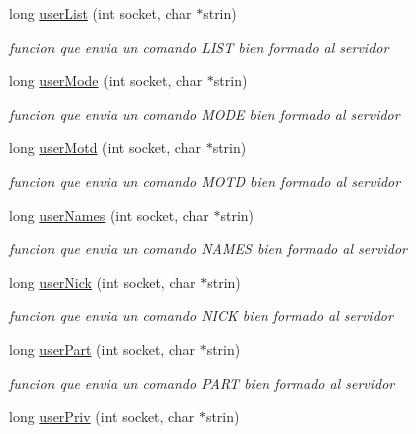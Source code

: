 \begin{DoxyCompactItemize}
long \hyperlink{_g-2301-05-_p2-user_commands_8h_a5f1403750b505dd46e42b4ee15f746da}{user\-List} (int socket, char $\ast$strin)
\begin{DoxyCompactList}\small\item\em funcion que envia un comando L\-I\-S\-T bien formado al servidor \end{DoxyCompactList}\item 
long \hyperlink{_g-2301-05-_p2-user_commands_8h_a97047be2e2e4c4de7a0b50bf5dbab322}{user\-Mode} (int socket, char $\ast$strin)
\begin{DoxyCompactList}\small\item\em funcion que envia un comando M\-O\-D\-E bien formado al servidor \end{DoxyCompactList}\item 
long \hyperlink{_g-2301-05-_p2-user_commands_8h_aa5e23ebf9d8d7f2212750a7d0b25cb15}{user\-Motd} (int socket, char $\ast$strin)
\begin{DoxyCompactList}\small\item\em funcion que envia un comando M\-O\-T\-D bien formado al servidor \end{DoxyCompactList}\item 
long \hyperlink{_g-2301-05-_p2-user_commands_8h_a15f6b4ed406c22d7cedebf968c431a38}{user\-Names} (int socket, char $\ast$strin)
\begin{DoxyCompactList}\small\item\em funcion que envia un comando N\-A\-M\-E\-S bien formado al servidor \end{DoxyCompactList}\item 
long \hyperlink{_g-2301-05-_p2-user_commands_8h_abbde12342143708da5cbbe02b42c6269}{user\-Nick} (int socket, char $\ast$strin)
\begin{DoxyCompactList}\small\item\em funcion que envia un comando N\-I\-C\-K bien formado al servidor \end{DoxyCompactList}\item 
long \hyperlink{_g-2301-05-_p2-user_commands_8h_a4bd2ce0bd04f220d817a5fdc05ce02c9}{user\-Part} (int socket, char $\ast$strin)
\begin{DoxyCompactList}\small\item\em funcion que envia un comando P\-A\-R\-T bien formado al servidor \end{DoxyCompactList}\item 
long \hyperlink{_g-2301-05-_p2-user_commands_8h_abf18bb836181af4b31693795692475b6}{user\-Priv} (int socket, char $\ast$strin)

\end{DoxyCompactItemize}
